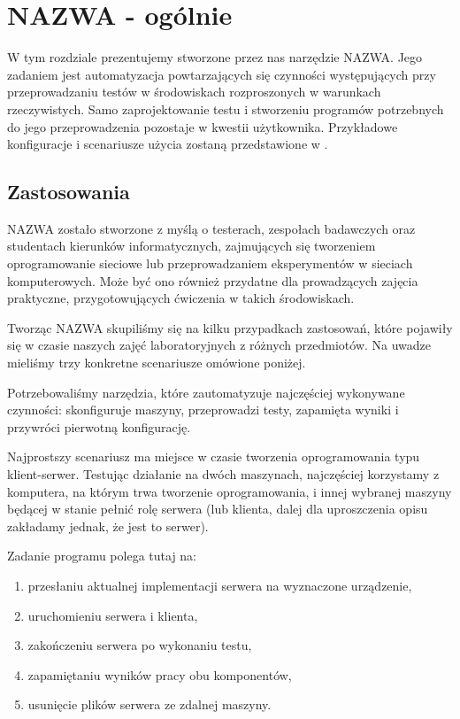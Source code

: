 \documentclass[00-praca-magisterska.tex]{subfiles}
\begin{document}
\chapter{NAZWA - ogólnie}

W tym rozdziale prezentujemy stworzone przez nas narzędzie NAZWA. Jego zadaniem
jest automatyzacja powtarzających się czynności występujących przy
przeprowadzaniu testów w środowiskach rozproszonych w warunkach rzeczywistych.
Samo zaprojektowanie testu i stworzeniu programów potrzebnych do jego
przeprowadzenia pozostaje w kwestii użytkownika. Przykładowe konfiguracje i
scenariusze użycia zostaną przedstawione w .

\section{Zastosowania}

NAZWA zostało stworzone z myślą o testerach, zespołach badawczych oraz
studentach kierunków informatycznych, zajmujących się tworzeniem oprogramowanie
sieciowe lub przeprowadzaniem eksperymentów w sieciach komputerowych. Może być
ono również przydatne dla prowadzących zajęcia praktyczne, przygotowujących
ćwiczenia w takich środowiskach.

Tworząc NAZWA skupiliśmy się na kilku przypadkach zastosowań, które pojawiły
się w czasie naszych zajęć laboratoryjnych z różnych przedmiotów. Na uwadze
mieliśmy trzy konkretne scenariusze omówione poniżej.

Potrzebowaliśmy narzędzia, które zautomatyzuje najczęściej wykonywane
czynności: skonfiguruje maszyny, przeprowadzi testy, zapamięta wyniki i
przywróci pierwotną konfigurację.


Najprostszy scenariusz ma miejsce w czasie tworzenia oprogramowania typu
klient-serwer. Testując działanie na dwóch maszynach, najczęściej korzystamy z
komputera, na którym trwa tworzenie oprogramowania, i innej wybranej maszyny
będącej w stanie pełnić rolę serwera (lub klienta, dalej dla uproszczenia opisu
zakładamy jednak, że jest to serwer).

Zadanie programu polega tutaj na:
\begin{enumerate}
\item przesłaniu aktualnej implementacji serwera na wyznaczone urządzenie,
\item uruchomieniu serwera i klienta,
\item zakończeniu serwera po wykonaniu testu,
\item zapamiętaniu wyników pracy obu komponentów,
\item usunięcie plików serwera ze zdalnej maszyny.
\end{enumerate}
\end{document}
